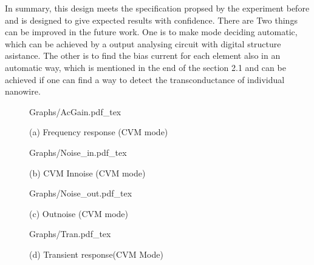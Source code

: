 \documentclass{article}
\begin{document}
In summary, this design meets the specification propsed by the experiment before and is designed to give expected results with confidence.
There are Two things can be improved in the future work.
One is to make mode deciding automatic, which can be achieved by a output analysing circuit with digital structure asistance.
The other is to find the bias current for each element also in an automatic way, which is mentioned in the end of the section 2.1
and can be achieved if one can find a way to detect the transconductance of individual nanowire.






\begin{figure}[!hb]
    \begin{minipage}[b]{1\linewidth}
        \centering
        \def\svgwidth{8cm}
        \fontsize{6}{8}\selectfont
         {Graphs/AcGain.pdf_tex}
        \fontsize{8}{10}\selectfont
        \centerline{(a) Frequency response (CVM mode)}\medskip
    \end{minipage}


    \begin{minipage}[!htb]{0.5\linewidth}
        \centering
        \def\svgwidth{4cm}
        \fontsize{6}{8}\selectfont
         {Graphs/Noise_in.pdf_tex}
        \fontsize{8}{10}\selectfont
        \centerline{(b) CVM Innoise (CVM mode) }\medskip
    \end{minipage}
    \hfill
    \begin{minipage}[!htb]{0.5\linewidth}
        \centering
        \def\svgwidth{5.1cm}
        \fontsize{6}{8}\selectfont
         {Graphs/Noise_out.pdf_tex}
        \fontsize{8}{10}\selectfont
        \centerline{(c) Outnoise (CVM mode) }\medskip
    \end{minipage}

    \begin{minipage}[!hb]{1\linewidth}
        \centering
        \def\svgwidth{9cm}
        \fontsize{4}{6}\selectfont
         {Graphs/Tran.pdf_tex}
        \fontsize{8}{10}\selectfont
        \centerline{(d) Transient response(CVM Mode) }\medskip
    \end{minipage}
    \caption{}
    \label{fig:res}
\end{figure}
\end{document}
